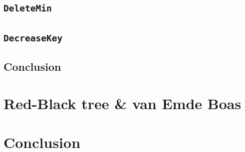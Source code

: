 \documentclass[a4paper,oneside,article,11pt]{memoir}
\begin{document}
\section{\texttt{DeleteMin}}

\section{\texttt{DecreaseKey}}


\section{Conclusion}


\chapter{Red-Black tree \& van Emde Boas}


\chapter{Conclusion}



\end{document}
